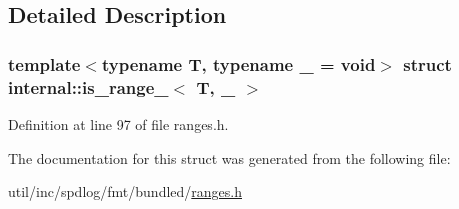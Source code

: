 \subsection{Detailed Description}
\subsubsection*{template$<$typename T, typename \+\_\+ = void$>$\newline
struct internal\+::is\+\_\+range\+\_\+$<$ T, \+\_\+ $>$}



Definition at line 97 of file ranges.\+h.



The documentation for this struct was generated from the following file\+:\begin{DoxyCompactItemize}
\item 
util/inc/spdlog/fmt/bundled/\hyperlink{ranges_8h}{ranges.\+h}\end{DoxyCompactItemize}
